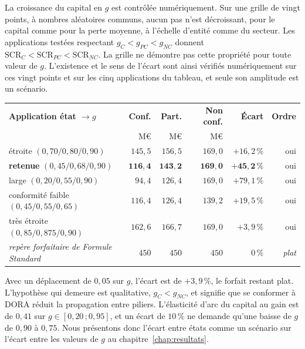 La croissance du capital en $g$ est contrôlée numériquement.
Sur une grille de vingt points, à nombres aléatoires communs, aucun pas n'est décroissant, pour le
capital comme pour la perte moyenne, à l'échelle d'entité comme du secteur. Les applications testées respectant $g_C < g_{PC} < g_{NC}$ donnent $\mathrm{SCR}_C < \mathrm{SCR}_{PC} < \mathrm{SCR}_{NC}$. La grille ne démontre pas cette propriété pour toute valeur de $g$. L'existence et le sens de l'écart sont
ainsi vérifiés numériquement sur ces vingt points et sur les cinq applications du tableau, et seule
son amplitude est un scénario.

\begin{center}\small
\renewcommand{\arraystretch}{1.25}
\begin{tabular}{@{}l r r r r r@{}}
\toprule
\textbf{Application état $\to g$} & \textbf{Conf.} & \textbf{Part.} & \textbf{Non conf.} &
\textbf{Écart} & \textbf{Ordre} \\
 & M\euro & M\euro & M\euro & & \\
\midrule
étroite $(0{,}70 / 0{,}80 / 0{,}90)$ & $145{,}5$ & $156{,}5$ & $169{,}0$ & $+16{,}2\,\%$ & oui \\
\textbf{retenue} $(0{,}45 / 0{,}68 / 0{,}90)$ & $\mathbf{116{,}4}$ & $\mathbf{143{,}2}$ &
$\mathbf{169{,}0}$ & $\mathbf{+45{,}2\,\%}$ & oui \\
large $(0{,}20 / 0{,}55 / 0{,}90)$ & $94{,}4$ & $126{,}4$ & $169{,}0$ & $+79{,}1\,\%$ & oui \\
conformité faible $(0{,}45 / 0{,}55 / 0{,}65)$ & $116{,}4$ & $126{,}4$ & $139{,}2$ &
$+19{,}5\,\%$ & oui \\
très étroite $(0{,}85 / 0{,}875 / 0{,}90)$ & $162{,}6$ & $166{,}7$ & $169{,}0$ & $+3{,}9\,\%$ &
oui \\
\midrule
\emph{repère forfaitaire de Formule Standard} & $450$ & $450$ & $450$ & $0\,\%$ & \emph{plat} \\
\bottomrule
\end{tabular}
\end{center}

\vspace{2pt}
\noindent Avec un déplacement de $0{,}05$ sur $g$, l'écart est de $+3{,}9\,\%$, le forfait restant plat. L'hypothèse qui demeure est qualitative, $g_C < g_{NC}$, et signifie que se conformer à
DORA réduit la propagation entre piliers. L'élasticité d'arc du capital au gain est de $0{,}41$ sur
$g \in [0{,}20\,;0{,}95]$, et un écart de $10\,\%$ ne demande qu'une baisse de $g$ de $0{,}90$ à
$0{,}75$. Nous présentons donc l'écart entre états comme un scénario sur l'écart entre les valeurs de $g$ au
chapitre~\ref{chap:resultats}.

